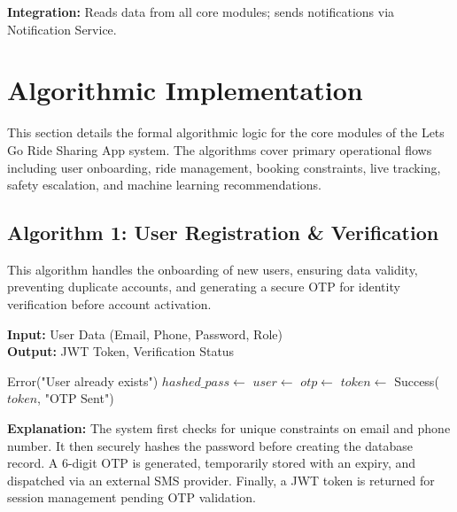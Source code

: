 \textbf{Integration:} Reads data from all core modules; sends notifications via Notification Service.


\section{Algorithmic Implementation}

This section details the formal algorithmic logic for the core modules of the Lets Go Ride Sharing App system. The algorithms cover primary operational flows including user onboarding, ride management, booking constraints, live tracking, safety escalation, and machine learning recommendations.

\subsection{Algorithm 1: User Registration \& Verification}

This algorithm handles the onboarding of new users, ensuring data validity, preventing duplicate accounts, and generating a secure OTP for identity verification before account activation.

\begin{algorithm}[H]
\caption{User Registration and OTP Generation}
\textbf{Input:} User Data (Email, Phone, Password, Role) \\
\textbf{Output:} JWT Token, Verification Status
\begin{algorithmic}[1]
        \State \Return Error("User already exists")
    \EndIf
    \State $hashed\_pass \gets$ 
    \State $user \gets$ 
    \State $otp \gets$ 
    \State {}
    \State {} 
    \State $token \gets$ 
    \State \Return Success($token$, "OTP Sent")
\EndFunction
\end{algorithmic}
\end{algorithm}

\textbf{Explanation:} The system first checks for unique constraints on email and phone number. It then securely hashes the password before creating the database record. A 6-digit OTP is generated, temporarily stored with an expiry, and dispatched via an external SMS provider. Finally, a JWT token is returned for session management pending OTP validation.

